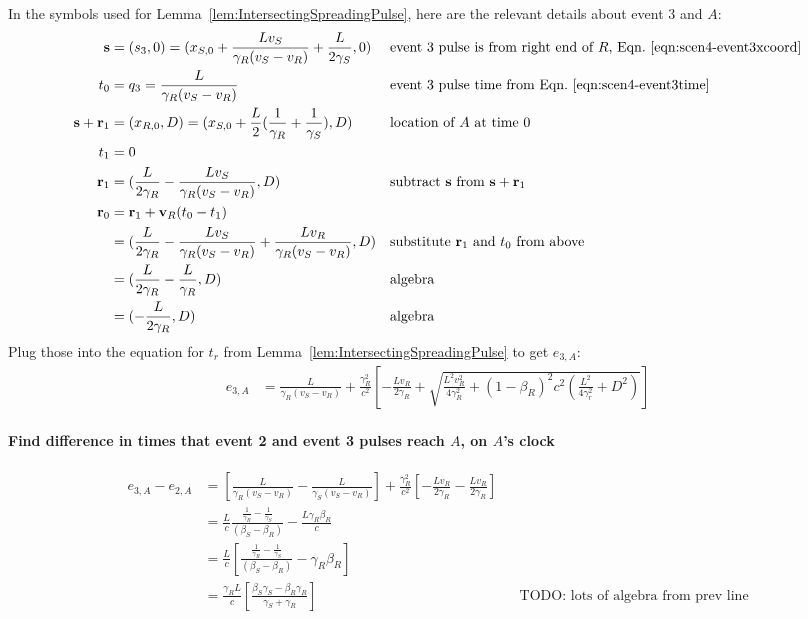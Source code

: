 \documentclass[a4paper]{article}
\theoremstyle{plain}
\theoremstyle{definition}
\newcommand{\vect}[1]{\mathbf{#1}}
\begin{document}
In the symbols used for Lemma~\ref{lem:IntersectingSpreadingPulse},
here are the relevant details about event 3 and $A$:
\begin{align*}
\vect{s} & = (s_3,0) = (x_{S,0} + \frac{Lv_S}{\gamma_R(v_S - v_R)} + \frac{L}{2\gamma_S}, 0) & & \text{event 3 pulse is from right end of $R$, Eqn.~\eqref{eqn:scen4-event3xcoord}} \\
t_0 & = q_3 = \frac{L}{\gamma_R(v_S - v_R)} & & \text{event 3 pulse time from Eqn.~\eqref{eqn:scen4-event3time}} \\
\vect{s} + \vect{r}_1 & = (x_{R,0}, D) = (x_{S,0} + \frac{L}{2} ( \frac{1}{\gamma_R} + \frac{1}{\gamma_S} ), D) & & \text{location of $A$ at time 0} \\
t_1 & = 0 \\
\vect{r}_1 & = (\frac{L}{2\gamma_R} - \frac{Lv_S}{\gamma_R(v_S - v_R)}, D) & & \text{subtract $\vect{s}$ from $\vect{s}+\vect{r}_1$} \\
\vect{r}_0
  & = \vect{r}_1 + \vect{v}_R(t_0-t_1) \\
  & = (\frac{L}{2\gamma_R} - \frac{Lv_S}{\gamma_R(v_S - v_R)} + \frac{Lv_R}{\gamma_R(v_S - v_R)}, D) & & \text{substitute $\vect{r}_1$ and $t_0$ from above} \\
  & = (\frac{L}{2\gamma_R} - \frac{L}{\gamma_R}, D) & & \text{algebra} \\
  & = (-\frac{L}{2\gamma_R}, D) & & \text{algebra}
\end{align*}
Plug those into the equation for $t_r$ from
Lemma~\ref{lem:IntersectingSpreadingPulse} to get $e_{3,A}$:
\begin{align*}
e_{3,A} & = \frac{L}{\gamma_R(v_S - v_R)} + \frac{\gamma_R^2}{c^2} \left[ -\frac{Lv_R}{2\gamma_R} + \sqrt{\frac{L^2v_R^2}{4\gamma_R^2} + (1-\beta_R)^2c^2 (\frac{L^2}{4\gamma_r^2} + D^2)} \right]
\end{align*}


\paragraph{Find difference in times that event 2 and event 3 pulses reach $A$, on $A$'s clock}

\begin{align*}
e_{3,A}-e_{2,A}
  & = \left[ \frac{L}{\gamma_R(v_S - v_R)} - \frac{L}{\gamma_S(v_S - v_R)} \right] + \frac{\gamma_R^2}{c^2} \left[ -\frac{Lv_R}{2\gamma_R} - \frac{Lv_R}{2\gamma_R} \right] \\
  & = \frac{L}{c} \frac{\frac{1}{\gamma_R} - \frac{1}{\gamma_S}}{(\beta_S - \beta_R)} - \frac{L\gamma_R\beta_R}{c} \\
  & = \frac{L}{c} \left[ \frac{\frac{1}{\gamma_R} - \frac{1}{\gamma_S}}{(\beta_S - \beta_R)} - \gamma_R\beta_R \right] \\
  & = \frac{\gamma_R L}{c} \left[ \frac{\beta_S\gamma_S - \beta_R\gamma_R}{\gamma_S + \gamma_R} \right] & & \text{TODO: lots of algebra from prev line}
\end{align*}
\end{document}
